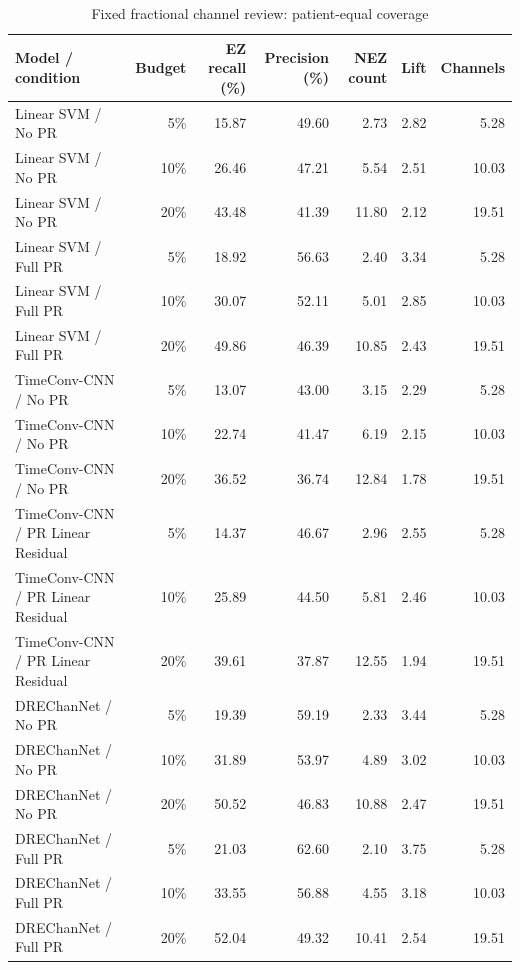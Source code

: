 \begin{table}[t]
\centering
\caption{Fixed fractional channel review: patient-equal coverage}
\small
\begin{tabular}{lrrrrrr}
\toprule
Model / condition & Budget & EZ recall (\%) & Precision (\%) & NEZ count & Lift & Channels \\
\midrule
Linear SVM / No PR & 5\% & 15.87 & 49.60 & 2.73 & 2.82 & 5.28 \\
Linear SVM / No PR & 10\% & 26.46 & 47.21 & 5.54 & 2.51 & 10.03 \\
Linear SVM / No PR & 20\% & 43.48 & 41.39 & 11.80 & 2.12 & 19.51 \\
Linear SVM / Full PR & 5\% & 18.92 & 56.63 & 2.40 & 3.34 & 5.28 \\
Linear SVM / Full PR & 10\% & 30.07 & 52.11 & 5.01 & 2.85 & 10.03 \\
Linear SVM / Full PR & 20\% & 49.86 & 46.39 & 10.85 & 2.43 & 19.51 \\
TimeConv-CNN / No PR & 5\% & 13.07 & 43.00 & 3.15 & 2.29 & 5.28 \\
TimeConv-CNN / No PR & 10\% & 22.74 & 41.47 & 6.19 & 2.15 & 10.03 \\
TimeConv-CNN / No PR & 20\% & 36.52 & 36.74 & 12.84 & 1.78 & 19.51 \\
TimeConv-CNN / PR Linear Residual & 5\% & 14.37 & 46.67 & 2.96 & 2.55 & 5.28 \\
TimeConv-CNN / PR Linear Residual & 10\% & 25.89 & 44.50 & 5.81 & 2.46 & 10.03 \\
TimeConv-CNN / PR Linear Residual & 20\% & 39.61 & 37.87 & 12.55 & 1.94 & 19.51 \\
DREChanNet / No PR & 5\% & 19.39 & 59.19 & 2.33 & 3.44 & 5.28 \\
DREChanNet / No PR & 10\% & 31.89 & 53.97 & 4.89 & 3.02 & 10.03 \\
DREChanNet / No PR & 20\% & 50.52 & 46.83 & 10.88 & 2.47 & 19.51 \\
DREChanNet / Full PR & 5\% & 21.03 & 62.60 & 2.10 & 3.75 & 5.28 \\
DREChanNet / Full PR & 10\% & 33.55 & 56.88 & 4.55 & 3.18 & 10.03 \\
DREChanNet / Full PR & 20\% & 52.04 & 49.32 & 10.41 & 2.54 & 19.51 \\
\bottomrule
\end{tabular}
\end{table}
